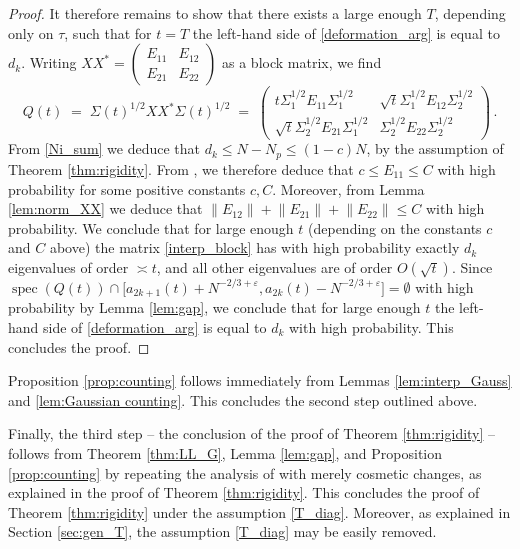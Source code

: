 \documentclass[11pt]{article} %
\numberwithin{equation}{section}
\numberwithin{figure}{section}
\theoremstyle{plain} %
\theoremstyle{definition} %
\renewcommand{\leq}{\leqslant}
\renewcommand{\epsilon}{\varepsilon}
\newcommand{\qb}[1]{\bigl[{#1}\bigr]}
\newcommand{\norm}[1]{\lVert #1 \rVert}
\DeclareMathOperator{\spec}{spec}
\begin{document}
\begin{proof}
It therefore remains to show that there exists a large enough $T$, depending only on $\tau$, such that for $t = T$ the left-hand side of \eqref{deformation_arg} is equal to $d_k$. Writing $X X^* = \begin{pmatrix}
E_{11} & E_{12}
\\
E_{21} & E_{22}
\end{pmatrix}$ as a block matrix, we find
\begin{equation} \label{interp_block}
Q(t) \;=\; \Sigma(t)^{1/2} X X^* \Sigma(t)^{1/2} \;=\; \begin{pmatrix}
t \Sigma_1^{1/2} E_{11} \Sigma_1^{1/2} & \sqrt{t} \Sigma_1^{1/2} E_{12} \Sigma_2^{1/2}
\\
\sqrt{t} \Sigma_2^{1/2} E_{21} \Sigma_1^{1/2} & \Sigma_2^{1/2} E_{22} \Sigma_2^{1/2}
\end{pmatrix}\,.
\end{equation}
From \eqref{Ni_sum} we deduce that $d_k \leq N - N_p \leq (1 - c) N$, by the assumption of Theorem \ref{thm:rigidity}. From \cite[Theorem 2.10]{BEKYY}, we therefore deduce that $c \leq E_{11} \leq C$ with high probability for some positive constants $c,C$. Moreover, from Lemma \ref{lem:norm_XX} we deduce that $\norm{E_{12}} + \norm{E_{21}}+ \norm{E_{22}} \leq C$ with high probability. We conclude that for large enough $t$ (depending on the constants $c$ and $C$ above) the matrix \eqref{interp_block} has with high probability exactly $d_k$ eigenvalues of order $\asymp t$, and all other eigenvalues are of order $O(\sqrt{t})$. Since $\spec(Q(t)) \cap \qb{a_{2k+1}(t) + N^{-2/3 + \epsilon}, a_{2k}(t) - N^{-2/3 + \epsilon}} = \emptyset$ with high probability by Lemma \ref{lem:gap}, we conclude that for large enough $t$ the left-hand side of \eqref{deformation_arg} is equal to $d_k$ with high probability. This concludes the proof.
\end{proof}

Proposition \ref{prop:counting} follows immediately from Lemmas \ref{lem:interp_Gauss} and \ref{lem:Gaussian counting}. This concludes the second step outlined above.

Finally, the third step -- the conclusion of the proof of Theorem \ref{thm:rigidity} -- follows from Theorem \ref{thm:LL_G}, Lemma \ref{lem:gap}, and Proposition \ref{prop:counting} by repeating the analysis of \cite{EYY3, PY} with merely cosmetic changes, as explained in the proof of Theorem \ref{thm:rigidity}. This concludes the proof of Theorem \ref{thm:rigidity} under the assumption \eqref{T_diag}. Moreover, as explained in Section \ref{sec:gen_T}, the assumption \eqref{T_diag} may be easily removed.
\end{document}
